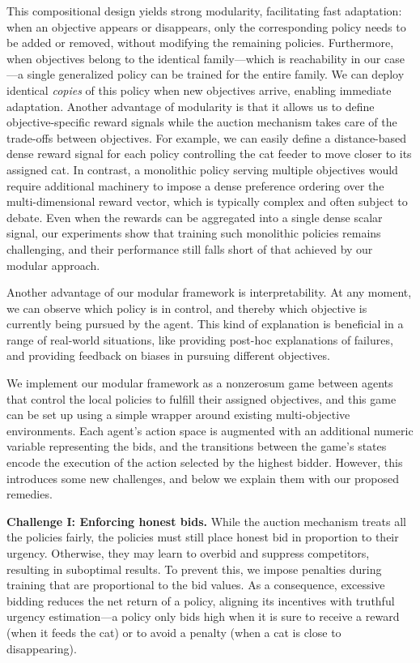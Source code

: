 This compositional design yields strong modularity, facilitating fast adaptation:
when an objective appears or disappears, only the corresponding policy needs to be added or removed, without modifying the remaining policies. 
Furthermore, when objectives belong to the identical family---which is reachability in our case---a single generalized policy can be trained for the entire family. 
We can deploy identical \emph{copies} of this policy when new objectives arrive, enabling immediate adaptation. 
Another advantage of modularity is that it allows us to define objective-specific reward signals while the auction mechanism takes care of the trade-offs between objectives.
For example, we can easily define a distance-based dense reward signal for each policy controlling the cat feeder to move closer to its assigned cat.
In contrast, a monolithic policy serving multiple objectives would require additional machinery to impose a dense preference ordering over the multi-dimensional reward vector, which is typically complex and often subject to debate.
Even when the rewards can be aggregated into a single dense scalar signal, our experiments show that training such monolithic policies remains challenging, and their performance still falls short of that achieved by our modular approach.


Another advantage of our modular framework is interpretability.
At any moment, we can observe which policy is in control, and thereby which objective is currently being pursued by the agent. 
This kind of explanation is beneficial in a range of real-world situations, like providing post-hoc explanations of failures, and providing feedback on biases in pursuing different objectives.


We implement our modular framework as a nonzerosum game between agents that control the local policies to fulfill their assigned objectives, and this game can be set up using a simple wrapper around existing multi-objective environments. 
Each agent's action space is augmented with an additional numeric variable representing the bids, and the transitions between the game's states encode the execution of the action selected by the highest bidder.
However, this introduces some new challenges, and below we explain them with our proposed remedies.

\textbf{Challenge I: Enforcing honest bids.}
While the auction mechanism treats all the policies fairly, the policies must still place honest bid in proportion to their urgency. 
Otherwise, they may learn to overbid and suppress competitors, resulting in suboptimal results. 
To prevent this, we impose penalties during training that are proportional to the bid values. 
As a consequence, excessive bidding reduces the net return of a policy, aligning its incentives with truthful urgency estimation---a policy only bids high when it is sure to receive a reward (when it feeds the cat) or to avoid a penalty (when a cat is close to disappearing).

